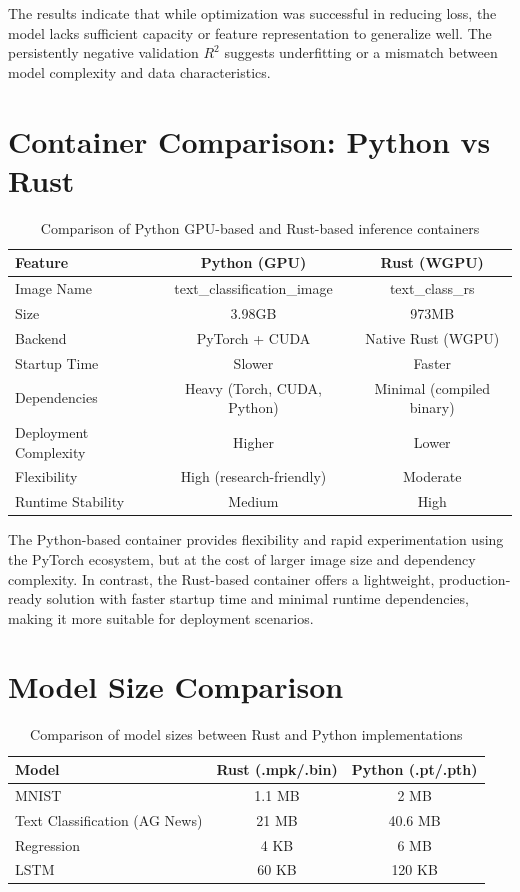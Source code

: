 \documentclass[12pt]{article}
\begin{document}
The results indicate that while optimization was successful in reducing loss, the model lacks sufficient capacity or feature representation to generalize well. The persistently negative validation $R^2$ suggests underfitting or a mismatch between model complexity and data characteristics.




\newpage

\section{Container Comparison: Python vs Rust}

\begin{table}[h]
\centering
\begin{tabular}{|l|c|c|}
\hline
\textbf{Feature} & \textbf{Python (GPU)} & \textbf{Rust (WGPU)} \\
\hline
Image Name & text\_classification\_image & text\_class\_rs \\
\hline
Size &  3.98GB &  973MB \\
\hline
Backend & PyTorch + CUDA & Native Rust (WGPU) \\
\hline
Startup Time & Slower & Faster \\
\hline
Dependencies & Heavy (Torch, CUDA, Python) & Minimal (compiled binary) \\
\hline
Deployment Complexity & Higher & Lower \\
\hline
Flexibility & High (research-friendly) & Moderate \\
\hline
Runtime Stability & Medium & High \\
\hline
\end{tabular}
\caption{Comparison of Python GPU-based and Rust-based inference containers}
\end{table}

\noindent
The Python-based container provides flexibility and rapid experimentation using the PyTorch ecosystem, but at the cost of larger image size and dependency complexity. In contrast, the Rust-based container offers a lightweight, production-ready solution with faster startup time and minimal runtime dependencies, making it more suitable for deployment scenarios.


\section{Model Size Comparison}

\begin{table}[h]
\centering
\begin{tabular}{|l|c|c|}
\hline
\textbf{Model} & \textbf{Rust (.mpk/.bin)} & \textbf{Python (.pt/.pth)} \\
\hline
MNIST & 1.1 MB & 2 MB \\
\hline
Text Classification (AG News) & 21 MB & 40.6 MB \\
\hline
Regression & 4 KB & 6 MB \\
\hline
LSTM & 60 KB & 120 KB \\
\hline
\end{tabular}
\caption{Comparison of model sizes between Rust and Python implementations}
\end{table}
\end{document}
